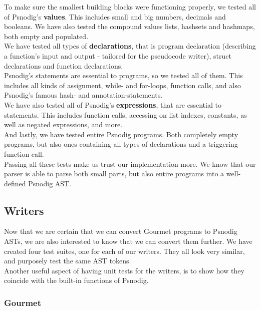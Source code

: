 To make sure the smallest building blocks were functioning properly, we tested all of Psnodig's \textbf{values}. This includes small and big numbers, decimals and booleans. We have also tested the compound values lists, hashsets and hashmaps, both empty and populated. \\

We have tested all types of \textbf{declarations}, that is program declaration (describing a function's input and output - tailored for the pseudocode writer), struct declarations and function declarations. \\

Psnodig's statements are essential to programs, so we tested all of them. This includes all kinds of assignment, while- and for-loops, function calls, and also Psnodig's famous hash- and annotation-statements. \\

We have also tested all of Psnodig's \textbf{expressions}, that are essential to statements. This includes function calls, accessing on list indexes, constants, as well as negated expressions, and more. \\

And lastly, we have tested entire Psnodig programs. Both completely empty programs, but also ones containing all types of declarations and a triggering function call. \\

Passing all these tests make us trust our implementation more. We know that our parser is able to parse both small parts, but also entire programs into a well-defined Psnodig AST.

\subsection{Writers}

Now that we are certain that we can convert Gourmet programs to Psnodig ASTs, we are also interested to know that we can convert them further. We have created four test suites, one for each of our writers. They all look very similar, and purposely test the same AST tokens. \\

Another useful aspect of having unit tests for the writers, is to show how they coincide with the built-in functions of Psnodig.

\subsubsection{Gourmet}

